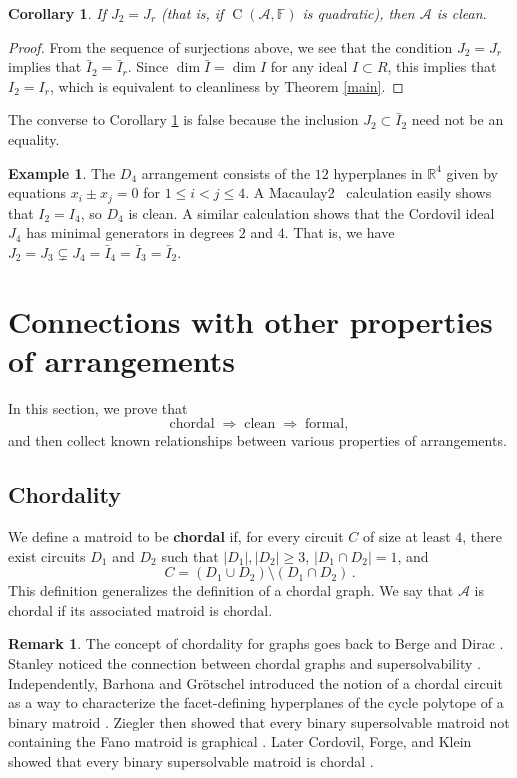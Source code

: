 \documentclass[11pt]{article}
\newtheorem{corollary}[theorem]{Corollary}
\theoremstyle{definition}
\newtheorem{example}[theorem]{Example}
\newtheorem{remark}[theorem]{Remark}
\renewcommand{\dim}{\operatorname{dim}}
\newcommand{\R}{{\mathbb{R}}}
\newcommand{\F}{\mathbb{F}}
\newcommand{\<}{\left<}
\renewcommand{\>}{\right>}
\newcommand{\cA}{\mathcal{A}}
\newcommand{\Cor}{\operatorname{C}}
\newcommand{\abs}[1]{\left|#1\right|}               %
\begin{document}
\begin{corollary}\label{cor:cordovil}
If $J_2 =  J_r$ (that is, if $\Cor(\cA,\F)$ is quadratic), then $\cA$ is clean.
\end{corollary}

\begin{proof}
From the sequence of surjections above, we see that the condition $J_2 = J_r$ implies that $\bar I_2 = \bar I_r$.
Since $\dim \bar I = \dim I$ for any ideal $I\subset R$, this implies that $I_2 = I_r$, which is equivalent to cleanliness
by Theorem \ref{main}.
\end{proof}

The converse to Corollary \ref{cor:cordovil} is false because the inclusion $J_2\subset \bar I_2$ need not be an equality.

\begin{example}\label{ex:d4}
  The $D_4$ arrangement consists of the $12$ hyperplanes in $\R^4$ given by equations $x_i\pm x_j=0$ for $1\leq i<j\leq 4$.  A
    Macaulay2~\cite{M2} calculation easily shows that $I_2=I_4$, so
    $D_4$ is clean.  A similar calculation shows
    that the Cordovil ideal $J_4$ has minimal generators
    in degrees $2$ and $4$.  That is, we have $J_2 =J_3 \subsetneq J_4 = \bar I_4 = \bar I_3 = \bar I_2$.
\end{example}


\section{Connections with other properties of arrangements}\label{sec:relationships}
In this section, we prove that
$$\text{chordal} \;\Longrightarrow\; \text{clean} \;\Longrightarrow\; \text{formal},$$
and then collect known relationships between various properties
of arrangements.

\subsection{Chordality}\label{sec:chordal}
We define a matroid to be {\bf chordal} if, for every circuit $C$ of size at least $4$, there exist circuits $D_1$ and $D_2$ such that $\abs{D_1},\abs{D_2} \geq 3$,  $\abs{D_1\cap D_2} = 1$, and
\[
    C = (D_1\cup D_2)\setminus (D_1\cap D_2)\,.
\]
This definition generalizes the definition of a chordal graph.  We say that $\cA$ is chordal if its associated matroid is chordal.

\begin{remark}
The concept of chordality for graphs goes back to Berge \cite{Berge} and Dirac \cite{Dirac}.
Stanley noticed the connection between chordal graphs and supersolvability \cite[Example 2.7, Proposition 2.8]{Stanley}.
Independently, Barhona and Grötschel introduced the notion of a chordal circuit as a way to characterize the facet-defining hyperplanes of the cycle polytope of a binary matroid \cite[p.53]{Barahona-Groetschel}.
Ziegler then showed that every binary supersolvable matroid not containing the Fano matroid is graphical \cite[Theorem 2.7]{Ziegler}.
Later Cordovil, Forge, and Klein showed that every binary supersolvable matroid is chordal \cite[Theorem 2.2]{Cordovil-Forge-Klein}.
\end{remark}
\end{document}
